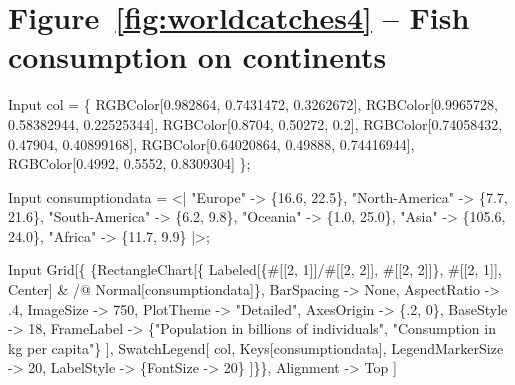 \documentclass[11pt,fleqn]{book} %
\begin{document}
\section*{Figure~\ref{fig:worldcatches4} -- Fish consumption on continents }
\small{
\begin{mmaCell}[index=1]{Input}
  col = \{
    RGBColor[0.982864, 0.7431472, 0.3262672], 
    RGBColor[0.9965728, 0.58382944, 0.22525344], 
    RGBColor[0.8704, 0.50272, 0.2], 
    RGBColor[0.74058432, 0.47904, 0.40899168], 
    RGBColor[0.64020864, 0.49888, 0.74416944], 
    RGBColor[0.4992, 0.5552, 0.8309304]
  \};
\end{mmaCell}

\begin{mmaCell}{Input}
  consumptiondata = <|
    "Europe"        -> \{16.6, 22.5\}, 
    "North-America" -> \{7.7, 21.6\}, 
    "South-America" -> \{6.2, 9.8\}, 
    "Oceania"       -> \{1.0, 25.0\}, 
    "Asia"          -> \{105.6, 24.0\}, 
    "Africa"        -> \{11.7, 9.9\}
  |>;
\end{mmaCell}

\begin{mmaCell}{Input}
  Grid[\{
    \{RectangleChart[\{
      Labeled[\{#[[2, 1]]/#[[2, 2]], #[[2, 2]]\}, #[[2, 1]], Center] & /@ 
        Normal[consumptiondata]\}, 
      BarSpacing  -> None, 
      AspectRatio -> .4, 
      ImageSize   -> 750, 
      PlotTheme   -> "Detailed", 
      AxesOrigin  -> \{.2, 0\}, 
      BaseStyle   -> 18, 
      FrameLabel  -> \{"Population in billions of individuals",
        "Consumption in kg per capita"\}
    ],
    SwatchLegend[
      col, Keys[consumptiondata], 
      LegendMarkerSize -> 20, 
      LabelStyle       -> \{FontSize -> 20\}
    ]\}\}, 
    Alignment -> Top
  ]
\end{mmaCell}
}

\end{document}

